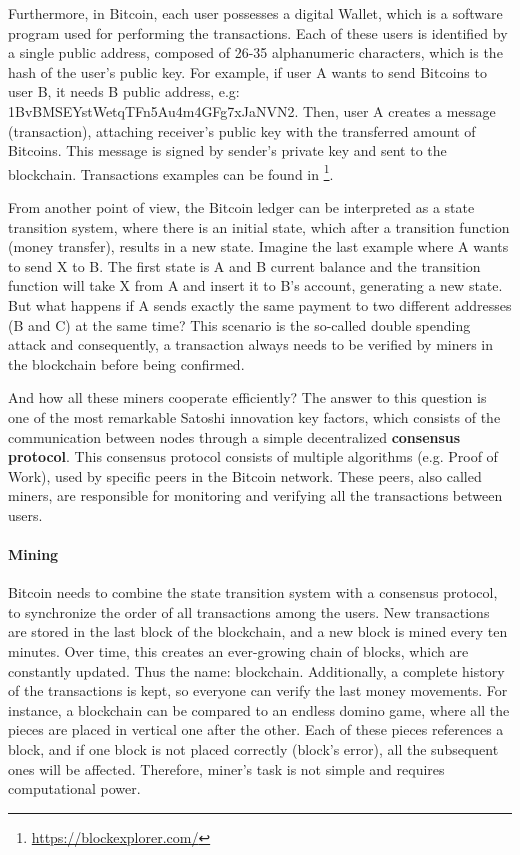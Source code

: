 Furthermore, in Bitcoin, each user possesses a digital Wallet, which is a software program used for performing the transactions. Each of these users is identified by a single public address, composed of 26-35 alphanumeric characters, which is the hash of the user's public key. For example, if user A wants to send Bitcoins to user B, it needs B public address, e.g: 1BvBMSEYstWetqTFn5Au4m4GFg7xJaNVN2. Then, user A creates a message (transaction), attaching receiver's public key with the transferred amount of Bitcoins. This message is signed by sender's private key and sent to the blockchain. Transactions examples can be found in \footnote{\url{https://blockexplorer.com/}}.

From another point of view, the Bitcoin ledger can be interpreted as a state transition system, where there is an initial state, which after a transition function (money transfer), results in a new state. Imagine the last example where A wants to send X to B. The first state is A and B current balance and the transition function will take X from A and insert it to B's account, generating a new state. But what happens if A sends exactly the same payment to two different addresses (B and C) at the same time? This scenario is the so-called double spending attack and consequently, a transaction always needs to be verified by miners in the blockchain before being confirmed.

And how all these miners cooperate efficiently? The answer to this question is one of the most remarkable Satoshi innovation key factors, which consists of the communication between nodes through a simple decentralized \textbf{ consensus protocol}. This consensus protocol consists of multiple algorithms (e.g. Proof of Work), used by specific peers in the Bitcoin network. These peers, also called miners, are responsible for monitoring and verifying all the transactions between users.

\paragraph{Mining}

Bitcoin needs to combine the state transition system with a consensus protocol, to synchronize the order of all transactions among the users.
New transactions are stored in the last block of the blockchain, and a new block is mined every ten minutes. Over time, this creates an ever-growing chain of blocks, which are constantly updated. Thus the name: blockchain. Additionally, a complete history of the transactions is kept, so everyone can verify the last money movements. For instance, a blockchain can be compared to an endless domino game, where all the pieces are placed in vertical one after the other. Each of these pieces references a block, and if one block is not placed correctly (block's error), all the subsequent ones will be affected. Therefore, miner's task is not simple and requires computational power.

